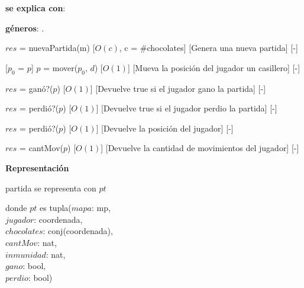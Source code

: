 \documentclass{book}
\begin{document}
    \begin{Interfaz}

        \textbf{se explica con}: 

        \textbf{géneros}: .


            {$res$ = nuevaPartida(m)}%
            [$O(c)$, c = \#chocolates]
            [Genera una nueva partida]
            [-]

            [$p_0$ = $p$]
            {$p$ = mover($p_0$, $d$)}%
            [$O(1)$]
            [Mueva la posición del jugador un casillero]
            [-]

            {$res$ = ganó?($p$)}%
            [$O(1)$]
            [Devuelve true si el jugador gano la partida]
            [-]

            {$res$ = perdió?($p$)}%
            [$O(1)$]
            [Devuelve true si el jugador perdio la partida]
            [-]

            {$res$ = perdió?($p$)}%
            [$O(1)$]
            [Devuelve la posición del jugador]
            [-]

            {$res$ = cantMov($p$)}%
            [$O(1)$]
            [Devuelve la cantidad de movimientos del jugador]
            [-]

    \end{Interfaz}

    \newpage

    \textbf{Representación}

    partida se representa con $pt$

    donde $pt$ es tupla($mapa$: mp, \\
        \text{}\qquad\quad$jugador$: coordenada, \\
        \text{}\qquad\quad$chocolates$: conj(coordenada), \\
        \text{}\qquad\quad$cantMov$: nat, \\
        \text{}\qquad\quad$inmunidad$: nat, \\
        \text{}\qquad\quad$gano$: bool, \\
        \text{}\qquad\quad$perdio$: bool)
\end{document}
